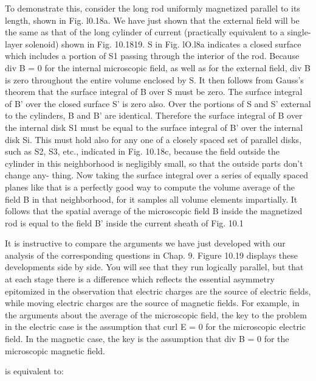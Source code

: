 To demonstrate this, consider the long rod uniformly magnetized
parallel to its length, shown in Fig. l0.18a. We have just shown that
the external field will be the same as that of the long cylinder of current
(practically equivalent to a single-layer solenoid) shown in
Fig. 10.1819. S in Fig. lO.l8a indicates a closed surface which includes
a portion of S1 passing through the interior of the rod.
Because div B = 0 for the internal microscopic field, as well as for
the external field, div B is zero throughout the entire volume enclosed
by S. It then follows from Gauss's theorem that the surface integral
of B over S must be zero. The surface integral of B' over the closed
surface S' is zero also. Over the portions of S and S' external to the
cylinders, B and B' are identical. Therefore the surface integral of B
over the internal disk S1 must be equal to the surface integral of B'
over the internal disk Si. This must hold also for any one of a closely
spaced set of parallel disks, such as S2, S3, etc., indicated in
Fig. 10.18c, because the field outside the cylinder in this neighborhood
is negligibly small, so that the outside parts don't change any-
thing. Now taking the surface integral over a series of equally spaced
planes like that is a perfectly good way to compute the volume
average of the field B in that neighborhood, for it samples all volume
elements impartially. It follows that the spatial average of the microscopic
field B inside the magnetized rod is equal to the field B' inside
the current sheath of Fig. 10.1%

It is instructive to compare the arguments we have just developed
with our analysis of the corresponding questions in Chap. 9. Figure
10.19 displays these developments side by side. You will see that
they run logically parallel, but that at each stage there is a difference
which reflects the essential asymmetry epitomized in the observation
that electric charges are the source of electric fields, while moving
electric charges are the source of magnetic fields. For example, in
the arguments about the average of the microscopic field, the key
to the problem in the electric case is the assumption that curl E = 0
for the microscopic electric field. In the magnetic case, the key is
the assumption that div B = 0 for the microscopic magnetic field.

is equivalent to:
\begin{equation}
\end{equation}

     

